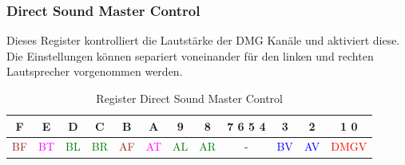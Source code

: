 \documentclass[11pt,a4paper]{scrartcl}
\begin{document}
\newpage


\subsubsection{Direct Sound Master Control}

Dieses Register kontrolliert die Lautst\"arke der DMG Kan\"ale und aktiviert diese. Die Einstellungen k\"onnen separiert voneinander f\"ur den linken und rechten Lautsprecher vorgenommen werden. 

\begin{table}[h]
	\centering
	\begin{tabular}{| c | c | c | c | c | c | c | c | c | c | c | c |}
	    \hline
	    F & E & D & C & B & A & 9 & 8 & 7 6 5 4 & 3 & 2 & 1 0 \\
	    \hline
	    \textcolor{brown}{BF} & \textcolor{magenta}{BT} & \textcolor{green}{BL} & \textcolor{green}{BR} & \textcolor{brown}{AF} & \textcolor{magenta}{AT}
	& \textcolor{green}{AL} & \textcolor{green}{AR} & - & \textcolor{blue}{BV} & \textcolor{blue}{AV} & \textcolor{red}{DMGV} \\
	    \hline
	\end{tabular}
	\caption{Register Direct Sound Master Control}
	\label{table: DirectSoundMasterControl}
\end{table}
	
\end{document}
